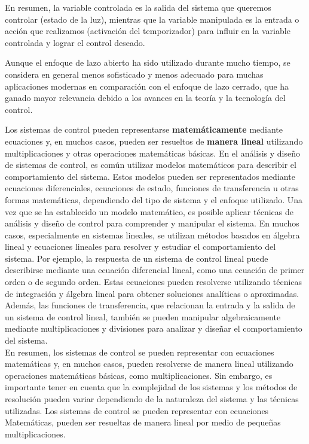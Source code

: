 \documentclass[
	12pt, %
	fleqn, %
	a4paper, %
	oneside, %
]{LegrandOrangeBook}
\begin{document}
En resumen, la variable controlada es la salida del sistema que queremos controlar (estado de la luz), mientras que la variable manipulada es la entrada o acción que realizamos (activación del temporizador) para influir en la variable controlada y lograr el control deseado.
\begin{notation}
Aunque el enfoque de lazo abierto ha sido utilizado durante mucho tiempo, se considera en general menos sofisticado y menos adecuado para muchas aplicaciones modernas en comparación con el enfoque de lazo cerrado, que ha ganado mayor relevancia debido a los avances en la teoría y la tecnología del control.
\end{notation}
Los sistemas de control pueden representarse \textbf{matemáticamente} mediante ecuaciones y, en muchos casos, pueden ser resueltos de \textbf{manera lineal} utilizando multiplicaciones y otras operaciones matemáticas básicas. En el análisis y diseño de sistemas de control, es común utilizar modelos matemáticos para describir el comportamiento del sistema. Estos modelos pueden ser representados mediante ecuaciones diferenciales, ecuaciones de estado, funciones de transferencia u otras formas matemáticas, dependiendo del tipo de sistema y el enfoque utilizado. 
Una vez que se ha establecido un modelo matemático, es posible aplicar técnicas de análisis y diseño de control para comprender y manipular el sistema. En muchos casos, especialmente en sistemas lineales, se utilizan métodos basados en álgebra lineal y ecuaciones lineales para resolver y estudiar el comportamiento del sistema. Por ejemplo, la respuesta de un sistema de control lineal puede describirse mediante una ecuación diferencial lineal, como una ecuación de primer orden o de segundo orden. Estas ecuaciones pueden resolverse utilizando técnicas de integración y álgebra lineal para obtener soluciones analíticas o aproximadas. Además, las funciones de transferencia, que relacionan la entrada y la salida de un sistema de control lineal, también se pueden manipular algebraicamente mediante multiplicaciones y divisiones para analizar y diseñar el comportamiento del sistema.\\
En resumen, los sistemas de control se pueden representar con ecuaciones matemáticas y, en muchos casos, pueden resolverse de manera lineal utilizando operaciones matemáticas básicas, como multiplicaciones. Sin embargo, es importante tener en cuenta que la complejidad de los sistemas y los métodos de resolución pueden variar dependiendo de la naturaleza del sistema y las técnicas utilizadas.
Los sistemas de control  se pueden representar con ecuaciones Matemáticas, pueden ser resueltas de manera lineal por medio de pequeñas multiplicaciones. 
\end{document}

